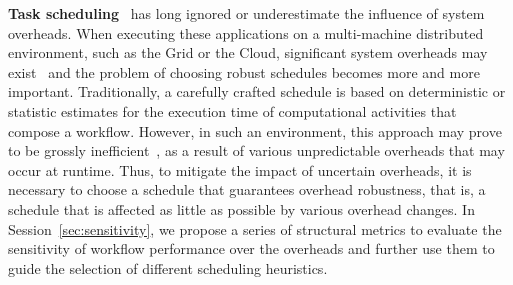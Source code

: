 \textbf{Task scheduling}~\cite{Caniou2011, Blythe2005, Casanova2000} has long ignored or underestimate the influence of system overheads. When executing these applications on a multi-machine distributed environment, such as the Grid or the Cloud, significant system overheads may exist~\cite{Chen2011, Prodan2008, Dong2010, Yang03, Chen2012b} and the problem of choosing robust schedules becomes more and more important. Traditionally, a carefully crafted schedule is based on deterministic or statistic estimates for the execution time of computational activities that compose a workflow. However, in such an environment, this approach may prove to be grossly inefficient~\cite{Chen2012b}, as a result of various unpredictable overheads that may occur at runtime. Thus, to mitigate the impact of uncertain overheads, it is necessary to choose a schedule that guarantees overhead robustness, that is, a schedule that is affected as little as possible by various overhead changes. In Session~\ref{sec:sensitivity}, we propose a series of structural metrics to evaluate the sensitivity of workflow performance over the overheads and further use them to guide the selection of different scheduling heuristics. 







